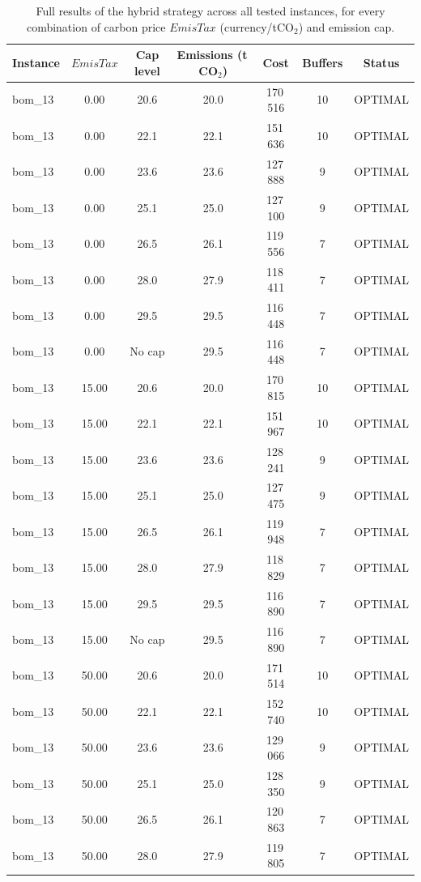 \begin{table}[!htbp]\centering\small
\caption{Full results of the hybrid strategy across all tested instances, for every combination of carbon price $EmisTax$ (currency/tCO$_2$) and emission cap.}\label{tab:hybridfull}
\begin{tabular}{lcccccc}
\toprule
Instance & $EmisTax$ & Cap level & Emissions (t\,CO$_2$) & Cost & Buffers & Status\\
\midrule
bom\_13 & 0.00 & 20.6 & 20.0 & 170\,516 & 10 & OPTIMAL \\
bom\_13 & 0.00 & 22.1 & 22.1 & 151\,636 & 10 & OPTIMAL \\
bom\_13 & 0.00 & 23.6 & 23.6 & 127\,888 & 9 & OPTIMAL \\
bom\_13 & 0.00 & 25.1 & 25.0 & 127\,100 & 9 & OPTIMAL \\
bom\_13 & 0.00 & 26.5 & 26.1 & 119\,556 & 7 & OPTIMAL \\
bom\_13 & 0.00 & 28.0 & 27.9 & 118\,411 & 7 & OPTIMAL \\
bom\_13 & 0.00 & 29.5 & 29.5 & 116\,448 & 7 & OPTIMAL \\
bom\_13 & 0.00 & No cap & 29.5 & 116\,448 & 7 & OPTIMAL \\
bom\_13 & 15.00 & 20.6 & 20.0 & 170\,815 & 10 & OPTIMAL \\
bom\_13 & 15.00 & 22.1 & 22.1 & 151\,967 & 10 & OPTIMAL \\
bom\_13 & 15.00 & 23.6 & 23.6 & 128\,241 & 9 & OPTIMAL \\
bom\_13 & 15.00 & 25.1 & 25.0 & 127\,475 & 9 & OPTIMAL \\
bom\_13 & 15.00 & 26.5 & 26.1 & 119\,948 & 7 & OPTIMAL \\
bom\_13 & 15.00 & 28.0 & 27.9 & 118\,829 & 7 & OPTIMAL \\
bom\_13 & 15.00 & 29.5 & 29.5 & 116\,890 & 7 & OPTIMAL \\
bom\_13 & 15.00 & No cap & 29.5 & 116\,890 & 7 & OPTIMAL \\
bom\_13 & 50.00 & 20.6 & 20.0 & 171\,514 & 10 & OPTIMAL \\
bom\_13 & 50.00 & 22.1 & 22.1 & 152\,740 & 10 & OPTIMAL \\
bom\_13 & 50.00 & 23.6 & 23.6 & 129\,066 & 9 & OPTIMAL \\
bom\_13 & 50.00 & 25.1 & 25.0 & 128\,350 & 9 & OPTIMAL \\
bom\_13 & 50.00 & 26.5 & 26.1 & 120\,863 & 7 & OPTIMAL \\
bom\_13 & 50.00 & 28.0 & 27.9 & 119\,805 & 7 & OPTIMAL \\

\end{tabular}
\end{table}

